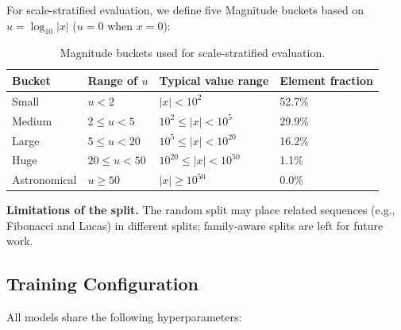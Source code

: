 For scale-stratified evaluation, we define five Magnitude buckets based on $u = \log_{10}|x|$
($u = 0$ when $x = 0$):

\begin{table}[t]
\caption{Magnitude buckets used for scale-stratified evaluation.}
\label{tab:buckets}
\centering
\begin{tabular}{llll}
\hline
Bucket       & Range of $u$           & Typical value range             & Element fraction \\
\hline
Small        & $u < 2$                & $|x| < 10^2$                    & 52.7\%           \\
Medium       & $2 \leq u < 5$         & $10^2 \leq |x| < 10^5$          & 29.9\%           \\
Large        & $5 \leq u < 20$        & $10^5 \leq |x| < 10^{20}$       & 16.2\%           \\
Huge         & $20 \leq u < 50$       & $10^{20} \leq |x| < 10^{50}$    &  1.1\%           \\
Astronomical & $u \geq 50$            & $|x| \geq 10^{50}$              &  0.0\%           \\
\hline
\end{tabular}
\end{table}

\textbf{Limitations of the split.} The random split may place related sequences (e.g.,
Fibonacci and Lucas) in different splits; family-aware splits are left for future work.

\subsection{Training Configuration}
\label{sec:training-config}

All models share the following hyperparameters:

